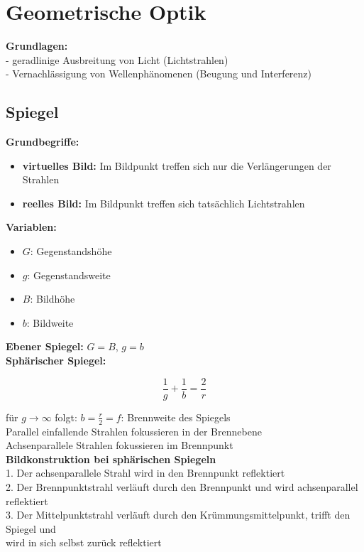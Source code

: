 \section{Geometrische Optik}

\textbf{Grundlagen:}\\
\hspace{5mm} - geradlinige Ausbreitung von Licht (Lichtstrahlen) \\
\hspace{5mm} - Vernachlässigung von Wellenphänomenen (Beugung und Interferenz)

\subsection{Spiegel}

\textbf{Grundbegriffe:}
\begin{itemize}
	\item \textbf{virtuelles Bild:} Im Bildpunkt treffen sich nur die Verlängerungen der Strahlen
	\item \textbf{reelles Bild:} Im Bildpunkt treffen sich tatsächlich Lichtstrahlen
\end{itemize}

\textbf{Variablen:}
\begin{itemize}
	\item $G$: Gegenstandshöhe
	\item $g$: Gegenstandsweite
	\item $B$: Bildhöhe
	\item $b$: Bildweite
\end{itemize}

\textbf{Ebener Spiegel:} $G = B$, $g = b$ \\

\textbf{Sphärischer Spiegel:}
\begin{formulabox}
    \[
        \frac{1}{g} + \frac{1}{b} = \frac{2}{r}
    \]
\end{formulabox}
für $g \rightarrow \infty$ folgt: $b = \frac{r}{2} = f$: Brennweite des Spiegels \\
Parallel einfallende Strahlen fokussieren in der Brennebene \\
Achsenparallele Strahlen fokussieren im Brennpunkt \\[1ex]

\textbf{Bildkonstruktion bei sphärischen Spiegeln} \\
1. Der achsenparallele Strahl wird in den Brennpunkt reflektiert \\
2. Der Brennpunktstrahl verläuft durch den Brennpunkt und wird achsenparallel \\ \hspace{2.3mm} reflektiert \\
3. Der Mittelpunktstrahl verläuft durch den Krümmungsmittelpunkt, trifft den Spiegel und \\ \hspace{2.3mm} wird in sich selbst zurück reflektiert \\[1ex]

